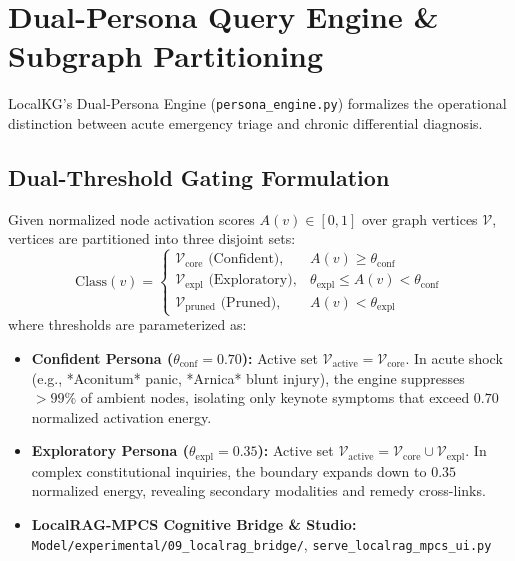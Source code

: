 \documentclass[10pt,twocolumn,letterpaper]{article}
\begin{document}
\section{Dual-Persona Query Engine \& Subgraph Partitioning}
LocalKG's Dual-Persona Engine (\texttt{persona\_engine.py}) formalizes the operational distinction between acute emergency triage and chronic differential diagnosis.

\subsection{Dual-Threshold Gating Formulation}
Given normalized node activation scores $A(v) \in [0, 1]$ over graph vertices $\mathcal{V}$, vertices are partitioned into three disjoint sets:
\begin{equation}
  \text{Class}(v) = \begin{cases}
    \mathcal{V}_{\text{core}} \text{ (Confident)}, & A(v) \ge \theta_{\text{conf}} \\
    \mathcal{V}_{\text{expl}} \text{ (Exploratory)}, & \theta_{\text{expl}} \le A(v) < \theta_{\text{conf}} \\
    \mathcal{V}_{\text{pruned}} \text{ (Pruned)}, & A(v) < \theta_{\text{expl}}
  \end{cases}
\end{equation}
where thresholds are parameterized as:
\begin{itemize}
  \item \textbf{Confident Persona ($\theta_{\text{conf}} = 0.70$):}
  Active set $\mathcal{V}_{\text{active}} = \mathcal{V}_{\text{core}}$. In acute shock (e.g., *Aconitum* panic, *Arnica* blunt injury), the engine suppresses $>99\%$ of ambient nodes, isolating only keynote symptoms that exceed $0.70$ normalized activation energy.
  \item \textbf{Exploratory Persona ($\theta_{\text{expl}} = 0.35$):}
  Active set $\mathcal{V}_{\text{active}} = \mathcal{V}_{\text{core}} \cup \mathcal{V}_{\text{expl}}$. In complex constitutional inquiries, the boundary expands down to $0.35$ normalized energy, revealing secondary modalities and remedy cross-links.
  \item \textbf{LocalRAG-MPCS Cognitive Bridge \& Studio:} \nolinkurl{Model/experimental/09_localrag_bridge/}, \nolinkurl{serve_localrag_mpcs_ui.py}
\end{itemize}
\end{document}
